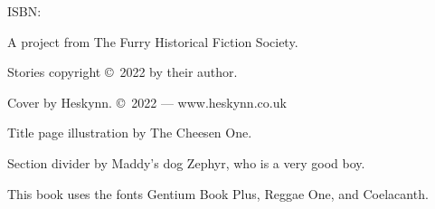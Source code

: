 \singlespacing
\thispagestyle{empty}
\null
\vfill
{\parindent0pt


\vspace{1ex}

ISBN: \ISBN

\vspace{1ex}

\textsc{\FullTitle}

A project from {\FHFS The Furry Historical Fiction Society}.

\vspace{1ex}

Stories copyright \copyright\ 2022 by their author.

\vspace{1ex}

Cover by Heskynn. \copyright\ 2022 --- www.heskynn.co.uk

Title page illustration by The Cheesen One.

Section divider by Maddy's dog Zephyr, who is a very good boy.

\vspace{1ex}

This book uses the fonts Gentium Book Plus, {\DisplayFont Reggae One}, and {\FHFS Coelacanth}.
}%

\clearpage
